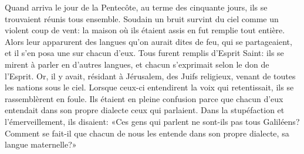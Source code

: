 Quand arriva le jour de la Pentecôte, au terme des cinquante jours,
	ils se trouvaient réunis tous ensemble.
Soudain un bruit survint du ciel comme un violent coup de vent:
	la maison où ils étaient assis en fut remplie tout entière.
Alors leur apparurent des langues qu’on aurait dites de feu,
	qui se partageaient,
	et il s’en posa une sur chacun d’eux.
Tous furent remplis d’Esprit Saint:
	ils se mirent à parler en d’autres langues,
	et chacun s’exprimait selon le don de l’Esprit.
Or, il y avait, résidant à Jérusalem,
	des Juifs religieux, venant de toutes les nations sous le ciel.
Lorsque ceux-ci entendirent la voix qui retentissait,
	ils se rassemblèrent en foule.
Ils étaient en pleine confusion
	parce que chacun d’eux
		entendait dans son propre dialecte ceux qui parlaient.
Dans la stupéfaction et l’émerveillement, ils disaient:
	«Ces gens qui parlent ne sont-ils pas tous Galiléens?
	Comment se fait-il que chacun de nous les entende dans son propre dialecte,
	sa langue maternelle?»
